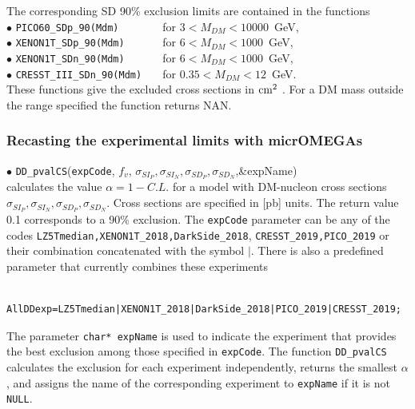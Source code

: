 \documentclass[12pt,a4paper]{article}
\begin{document}
\noindent
The corresponding SD 90\% exclusion limits are contained in the functions\\

\noindent 
$\bullet$ \verb|PICO60_SDp_90(Mdm)       | for  $ 3 < M_{DM} < 10000$~GeV,  \cite{Amole:2019fdf} \\
\noindent
$\bullet$ \verb|XENON1T_SDp_90(Mdm)      | for  $ 6 <  M_{DM} < 1000$~GeV, \cite{Aprile:2019dbj} \\
\noindent
$\bullet$ \verb|XENON1T_SDn_90(Mdm)      | for  $ 6 <  M_{DM} < 1000$~GeV, \cite{Aprile:2019dbj} \\
\noindent
$\bullet$ \verb|CRESST_III_SDn_90(Mdm)   |  for $ 0.35 < M_{DM} < 12$~GeV. ~\cite{Abdelhameed:2019hmk}\\


These functions give the  excluded cross sections in ${\rm cm}^2$ . For a DM mass outside the range specified the function returns
NAN.

\subsubsection{Recasting the experimental limits with  micrOMEGAs}  
\label{Recasting}


\noindent
$\bullet$ \verb|DD_pvalCS|(\verb|expCode|, $f_v$, $\sigma_{SI_P},\sigma_{SI_N},\sigma_{SD_P}, \sigma_{SD_N}$,\&expName)\\
calculates the  value $\alpha= 1-C.L.$  for a model with DM-nucleon cross sections 
$\sigma_{SI_P},\sigma_{SI_N},\sigma_{SD_P}, \sigma_{SD_N}$. Cross sections are specified in
[pb] units. The return value 0.1 corresponds to a 90\% exclusion.   
 The {\tt expCode} parameter can be any of the codes  \verb|LZ5Tmedian,XENON1T_2018,DarkSide_2018|, \verb|CRESST_2019,PICO_2019| or their combination concatenated with the symbol
$\mid$. There is also a predefined parameter that  currently combines these experiments 
\begin{verbatim}
  AllDDexp=LZ5Tmedian|XENON1T_2018|DarkSide_2018|PICO_2019|CRESST_2019;
\end{verbatim}

The parameter {\tt char* expName}  is used to indicate the   experiment that  provides
the best exclusion among those specified in  {\tt expCode}.   The function {\tt DD\_pvalCS } calculates the
exclusion for each experiment  independently, returns the smallest $\alpha$, and assigns the 
name of the corresponding experiment to  {\tt expName}  if it is not {\tt NULL}.  
\end{document}

